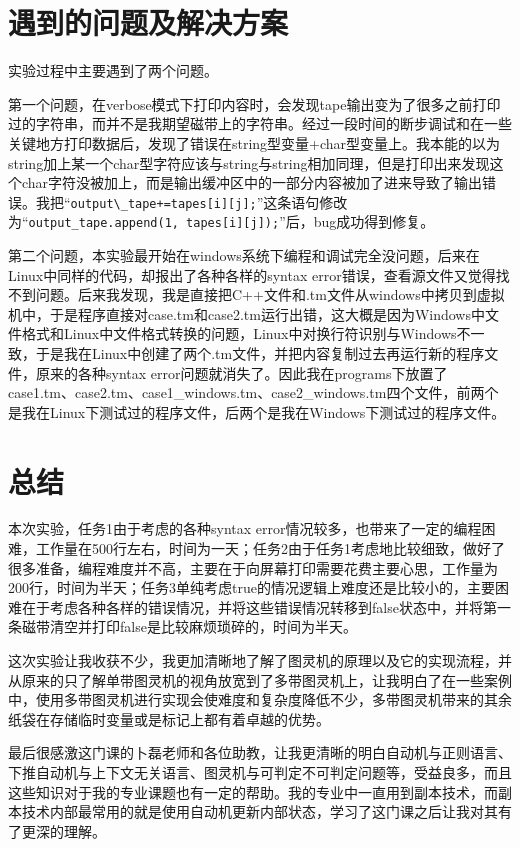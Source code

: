 \documentclass[UTF8]{article}
\begin{document}
\section{遇到的问题及解决方案}
实验过程中主要遇到了两个问题。

第一个问题，在verbose模式下打印内容时，会发现tape输出变为了很多之前打印过的字符串，而并不是我期望磁带上的字符串。经过一段时间的断步调试和在一些关键地方打印数据后，发现了错误在string型变量+char型变量上。我本能的以为string加上某一个char型字符应该与string与string相加同理，但是打印出来发现这个char字符没被加上，而是输出缓冲区中的一部分内容被加了进来导致了输出错误。我把``\verb|output\_tape+=tapes[i][j];|''这条语句修改为``\verb|output_tape.append(1, tapes[i][j]);|''后，bug成功得到修复。

第二个问题，本实验最开始在windows系统下编程和调试完全没问题，后来在Linux中同样的代码，却报出了各种各样的syntax error错误，查看源文件又觉得找不到问题。后来我发现，我是直接把C++文件和.tm文件从windows中拷贝到虚拟机中，于是程序直接对case.tm和case2.tm运行出错，这大概是因为Windows中文件格式和Linux中文件格式转换的问题，Linux中对换行符识别与Windows不一致，于是我在Linux中创建了两个.tm文件，并把内容复制过去再运行新的程序文件，原来的各种syntax error问题就消失了。因此我在programs下放置了case1.tm、case2.tm、case1\_windows.tm、case2\_windows.tm四个文件，前两个是我在Linux下测试过的程序文件，后两个是我在Windows下测试过的程序文件。

\section{总结}
本次实验，任务1由于考虑的各种syntax error情况较多，也带来了一定的编程困难，工作量在500行左右，时间为一天；任务2由于任务1考虑地比较细致，做好了很多准备，编程难度并不高，主要在于向屏幕打印需要花费主要心思，工作量为200行，时间为半天；任务3单纯考虑true的情况逻辑上难度还是比较小的，主要困难在于考虑各种各样的错误情况，并将这些错误情况转移到false状态中，并将第一条磁带清空并打印false是比较麻烦琐碎的，时间为半天。

这次实验让我收获不少，我更加清晰地了解了图灵机的原理以及它的实现流程，并从原来的只了解单带图灵机的视角放宽到了多带图灵机上，让我明白了在一些案例中，使用多带图灵机进行实现会使难度和复杂度降低不少，多带图灵机带来的其余纸袋在存储临时变量或是标记上都有着卓越的优势。

最后很感激这门课的卜磊老师和各位助教，让我更清晰的明白自动机与正则语言、下推自动机与上下文无关语言、图灵机与可判定不可判定问题等，受益良多，而且这些知识对于我的专业课题也有一定的帮助。我的专业中一直用到副本技术，而副本技术内部最常用的就是使用自动机更新内部状态，学习了这门课之后让我对其有了更深的理解。
\end{document}

